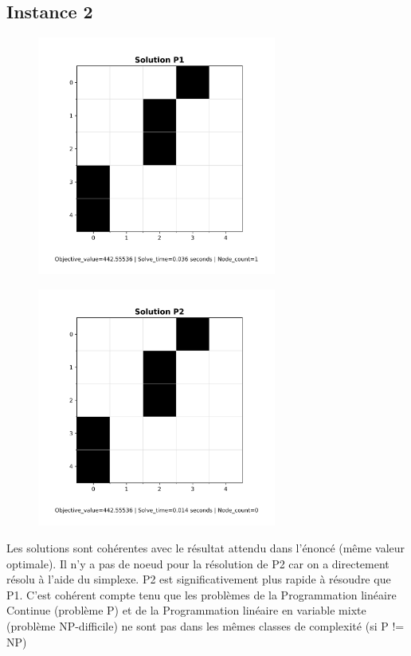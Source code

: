\documentclass[a4paper,11pt]{article}
\begin{document}
\subsection{Instance 2}
\begin{figure}[H]
  \centering
  \includegraphics[width=0.7\textwidth]{figs/P1_solution_instance2.png}
\end{figure}
\begin{figure}[H]
  \centering
  \includegraphics[width=0.7\textwidth]{figs/P2_solution_instance2.png}
\end{figure}

Les solutions sont cohérentes avec le résultat attendu dans l'énoncé (même valeur optimale). 
Il n'y a pas de noeud pour la résolution de P2 car on a directement résolu à l'aide du simplexe. P2 est significativement plus rapide à résoudre que P1. 
C'est cohérent compte tenu que les problèmes de la Programmation linéaire Continue (problème P) et de la Programmation linéaire en variable mixte 
(problème NP-difficile) ne sont pas dans les mêmes classes de complexité (si P != NP)
\end{document}
